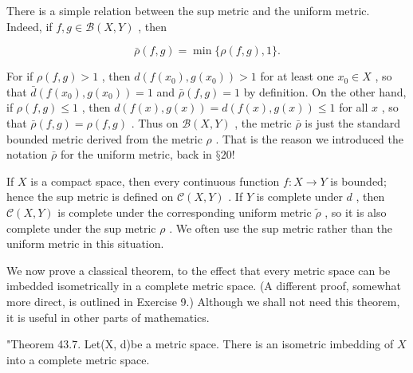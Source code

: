 There is a simple relation between the sup metric and the uniform metric. Indeed, if \(f,g \in  \mathcal{B}\left( {X,Y}\right)\) , then

\[
\bar{\rho }\left( {f,g}\right)  = \min \{ \rho \left( {f,g}\right) ,1\} .
\]

For if \(\rho \left( {f,g}\right)  > 1\) , then \(d\left( {f\left( {x}_{0}\right) ,g\left( {x}_{0}\right) }\right)  > 1\) for at least one \({x}_{0} \in  X\) , so that \(\bar{d}\left( {f\left( {x}_{0}\right) ,g\left( {x}_{0}\right) }\right)  = 1\) and \(\bar{\rho }\left( {f,g}\right)  = 1\) by definition. On the other hand, if \(\rho \left( {f,g}\right)  \leq  1\) , then \(d\left( {f\left( x\right) ,g\left( x\right) }\right)  = d\left( {f\left( x\right) ,g\left( x\right) }\right)  \leq  1\) for all \(x\) , so that \(\bar{\rho }\left( {f,g}\right)  = \rho \left( {f,g}\right)\) . Thus on \(\mathcal{B}\left( {X,Y}\right)\) , the metric \(\bar{\rho }\) is just the standard bounded metric derived from the metric \(\rho\) . That is the reason we introduced the notation \(\bar{\rho }\) for the uniform metric, back in \(§{20}!\)

If \(X\) is a compact space, then every continuous function \(f : X \rightarrow  Y\) is bounded; hence the sup metric is defined on \(\mathcal{C}\left( {X,Y}\right)\) . If \(Y\) is complete under \(d\) , then \(\mathcal{C}\left( {X,Y}\right)\) is complete under the corresponding uniform metric \(\widetilde{\rho }\) , so it is also complete under the sup metric \(\rho\) . We often use the sup metric rather than the uniform metric in this situation.

We now prove a classical theorem, to the effect that every metric space can be imbedded isometrically in a complete metric space. (A different proof, somewhat more direct, is outlined in Exercise 9.) Although we shall not need this theorem, it is useful in other parts of mathematics.

"Theorem 43.7. Let(X, d)be a metric space. There is an isometric imbedding of \(X\) into a complete metric space.

